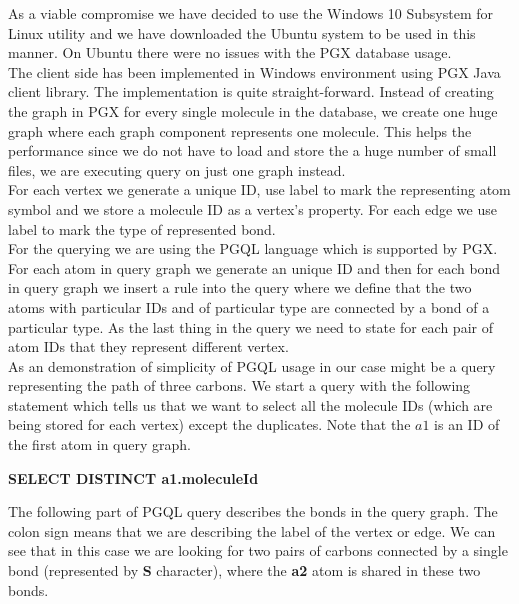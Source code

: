 {As a viable compromise we have decided to use the Windows 10 Subsystem for Linux utility \cite{wsl} and we have downloaded the Ubuntu system to be used in this manner. On Ubuntu there were no issues with the PGX database usage.\\

The client side has been implemented in Windows environment using PGX Java client library. The implementation is quite straight-forward. Instead of creating the graph in PGX for every single molecule in the database, we create one huge graph where each graph component represents one molecule. This helps the performance since we do not have to load and store the a huge number of small files, we are executing query on just one graph instead.\\

For each vertex we generate a unique ID, use label to mark the representing atom symbol and we store a molecule ID as a vertex's property. For each edge we use label to mark the type of represented bond.\\

For the querying we are using the PGQL language which is supported by PGX. For each atom in query graph we generate an unique ID and then for each bond in query graph we insert a rule into the query where we define that the two atoms with particular IDs and of particular type are connected by a bond of a particular type. As the last thing in the query we need to state for each pair of atom IDs that they represent different vertex.\\

As an demonstration of simplicity of PGQL usage in our case might be a query representing the path of three carbons. We start a query with the following statement which tells us that we want to select all the molecule IDs (which are being stored for each vertex) except the duplicates. Note that the $a1$ is an ID of the first atom in query graph.

\begin{center}
	\textbf{SELECT DISTINCT a1.moleculeId}
\end{center}

The following part of PGQL query describes the bonds in the query graph. The colon sign means that we are describing the label of the vertex or edge. We can see that in this case we are looking for two pairs of carbons connected by a single bond (represented by \textbf{S} character), where the \textbf{a2} atom is shared in these two bonds.

}
